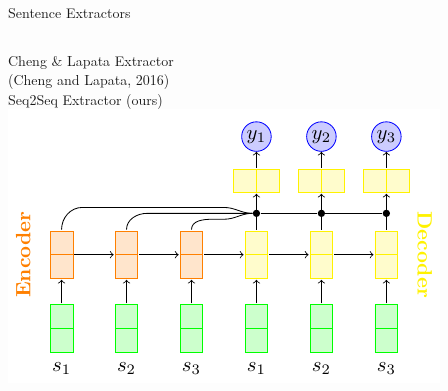 \begin{frame}{Sentence Extractors}
\begin{columns}[t]
   \centering
   Cheng \& Lapata Extractor\\
   (Cheng and Lapata, 2016)\\
   Seq2Seq Extractor (ours)\\
   \includegraphics[scale=.65]{3_deep_learning_models_of_salience/image_texs/s2s/s2s.pdf}
 \end{columns}

\end{frame}

